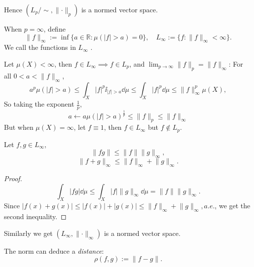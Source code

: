 Hence $(L_p / \sim, \lVert \cdot \rVert _p)$ is a normed vector space.

When $p = \infty$, define
\[
\lVert f \rVert _{\infty} := \inf \{a\in \mathbb{R}: \mu(|f|>a) = 0\},\quad
L_\infty := \{f: \lVert f \rVert _\infty < \infty\}.
\]
We call the functions in $L_\infty$ .

Let $\mu(X)< \infty$, then $f\in L_\infty \implies f\in L_p$,
and $ \lim_{p\to \infty} \lVert f \rVert _p = \lVert f \rVert _\infty$:
For all $0 < a < \lVert f \rVert _\infty$,
\[
a^p \mu(|f|>a) \le \int_X |f|^p\ii_{|f|>a} \dd \mu
\le \int_X |f|^p\dd \mu \le \lVert f \rVert _\infty^p \mu(X),
\]
So taking the exponent $\frac{1}{p}$,
\[
a \leftarrow
a \mu(|f|>a)^{\frac{1}{p}}\le \lVert f \rVert _p \le \lVert f \rVert _\infty
\]
But when $\mu(X) = \infty$, let $f \equiv 1$, then $f\in L_\infty$ but
$f \notin L_p$.

 \begin{theorem}
	Let $f, g\in L_\infty$,
    \[
    \lVert fg \rVert \le \lVert f \rVert \lVert g \rVert _\infty,
    \]
    \[
    \lVert f+g \rVert _\infty \le \lVert f \rVert _\infty + \lVert g \rVert _\infty.
    \]
\end{theorem}
\begin{proof}[Proof]
    \[
    \int_X |fg|\dd \mu \le \int_X |f|\lVert g \rVert _\infty\dd\mu
	= \lVert f \rVert \lVert g \rVert _\infty.
    \]
    Since $|f(x)+g(x)|\le |f(x)| + |g(x)| \le \lVert f \rVert _\infty
	+ \lVert g \rVert _\infty, a.e.$, we get the second inequality.
\end{proof}
Similarly we get $(L_\infty, \lVert \cdot \rVert _\infty)$ is a normed vector space.

The norm can deduce a \textit{distance}:
\[
\rho(f, g):= \lVert f - g \rVert .
\]

